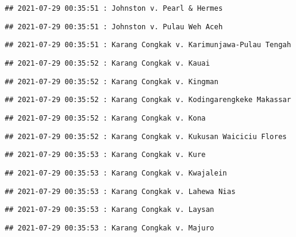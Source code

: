 \documentclass[
]{article}
\begin{document}
\begin{verbatim}
## 2021-07-29 00:35:51 : Johnston v. Pearl & Hermes
\end{verbatim}

\begin{verbatim}
## 2021-07-29 00:35:51 : Johnston v. Pulau Weh Aceh
\end{verbatim}

\begin{verbatim}
## 2021-07-29 00:35:51 : Karang Congkak v. Karimunjawa-Pulau Tengah
\end{verbatim}

\begin{verbatim}
## 2021-07-29 00:35:52 : Karang Congkak v. Kauai
\end{verbatim}

\begin{verbatim}
## 2021-07-29 00:35:52 : Karang Congkak v. Kingman
\end{verbatim}

\begin{verbatim}
## 2021-07-29 00:35:52 : Karang Congkak v. Kodingarengkeke Makassar
\end{verbatim}

\begin{verbatim}
## 2021-07-29 00:35:52 : Karang Congkak v. Kona
\end{verbatim}

\begin{verbatim}
## 2021-07-29 00:35:52 : Karang Congkak v. Kukusan Waiciciu Flores
\end{verbatim}

\begin{verbatim}
## 2021-07-29 00:35:53 : Karang Congkak v. Kure
\end{verbatim}

\begin{verbatim}
## 2021-07-29 00:35:53 : Karang Congkak v. Kwajalein
\end{verbatim}

\begin{verbatim}
## 2021-07-29 00:35:53 : Karang Congkak v. Lahewa Nias
\end{verbatim}

\begin{verbatim}
## 2021-07-29 00:35:53 : Karang Congkak v. Laysan
\end{verbatim}

\begin{verbatim}
## 2021-07-29 00:35:53 : Karang Congkak v. Majuro
\end{verbatim}
\end{document}
